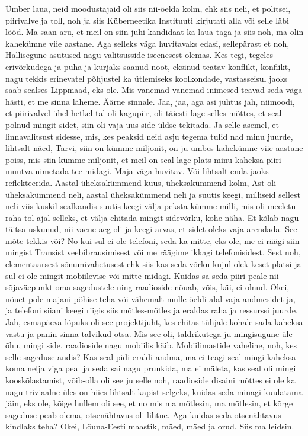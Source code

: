 Ümber laua, neid moodustajaid oli siis nii-öelda kolm, ehk siis neli, et politsei, piirivalve ja toll, noh ja siis Küberneetika Instituuti kirjutati alla või selle läbi lööd. Ma saan aru, et meil on siin juhi kandidaat ka laua taga ja siis noh, ma olin kahekümne viie aastane. Aga selleks väga huvitavaks edasi, sellepärast et noh, Hallisegune asutused nagu valitsusside iseenesest olemas. Kes tegi, tegeles erivõrkudega ja puha ja kurjaks saanud noot, eksinud teatav konflikt, konflikt, nagu tekkis erinevatel põhjustel ka ütlemiseks koolkondade, vastasseisul jaoks saab sealses Lippmaad, eks ole. Mis vanemad vanemad inimesed teavad seda väga hästi, et me sinna läheme. Äärne sinnale. Jaa, jaa, aga asi juhtus jah, niimoodi, et piirivalvel ühel hetkel tal oli kagupiir, oli täiesti lage selles mõttes, et seal polnud mingit sidet, siin oli vaja uus side üldse tekitada. Ja selle asemel, et linnavalitsust sidesse, mis, kes peaksid neid asju tegema tulid nad minu juurde, lihtsalt näed, Tarvi, siin on kümme miljonit, on ju umbes kahekümne viie aastane poiss, mis siin kümme miljonit, et meil on seal lage plats minu kaheksa piiri muutva nimetada tee midagi. Maja väga huvitav. Või lihtsalt enda jaoks reflekteerida. Aastal üheksakümmend kuus, üheksakümmend kolm, Ast oli üheksakümmend neli, aastal üheksakümmend neli ja suutis keegi, milliseid sellest neli-viis kuskil sealkandis suutis keegi välja peksta kümme milli, mis oli meeletu raha tol ajal selleks, et välja ehitada mingit sidevõrku, kohe näha. Et kõlab nagu täitsa uskunud, nii vaene aeg oli ja keegi arvas, et sidet oleks vaja arendada. See mõte tekkis või? No kui sul ei ole telefoni, seda ka mitte, eks ole, me ei räägi siin mingist Transist veebibrausimisest või me räägime ikkagi telefonisidest. Sest noh, elementaarsest sõnumivahetusest ehk siis kas seda võrku kujul olek keset platsi ja sul ei ole mingit mobiilevise või mitte midagi. Kuidas sa seda piiri peale nii sõjaväepunkt oma sagedustele ning raadioside nõuab, võis, käi, ei olnud. Okei, nõuet pole majani põhise teha või vähemalt mulle öeldi alal vaja andmesidet ja, ja telefoni siiani keegi riigis siis mõtles-mõtles ja eraldas raha ja ressurssi juurde. Jah, esmapäeva lõpuks oli see projektijuht, kes ehitas tühjale kohale sada kaheksa vastu ja panin sinna talvikud otsa. Mis see oli, taldrikutega ju mingisugune üle õhu, mingi side, raadioside nagu mobiilis käib. Mobiilimastide vaheline, noh, kes selle sageduse andis? Kas seal pidi eraldi andma, ma ei teagi seal mingi kaheksa koma nelja viga peal ja seda sai nagu pruukida, ma ei mäleta, kas seal oli mingi kooskõlastamist, võib-olla oli see ju selle noh, raadioside disaini mõttes ei ole ka nagu triviaalne üles on hiies lihtsalt kapist selgeks, kuidas seda minagi kuulatama jäin, eks ole, kõige hullem oli see, et no mis ma mõtlesin, ma mõtlesin, et kõrge sageduse peab olema, otsenähtavus oli lihtne. Aga kuidas seda otsenähtavus kindlaks teha? Okei, Lõuna-Eesti maastik, mäed, mäed ja orud. Siis ma leidsin.
